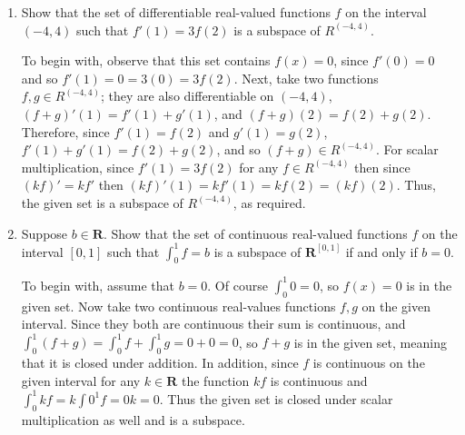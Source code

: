 \documentclass{book}
\begin{document}
\begin{enumerate}
(d) Since the derivative of two functions is additive, if \(f'(2) = b\) and \(g'(2) = b\) and \(b \neq 0\) then \((f+g)'(2) = f'(2) + g'(2) = b + b \neq b\); so, the given subset is not closed under addition (nor scalar multiplication) and cannot be a subspace.  However, any linear combination of functions with \(f'(2)=0\) will also have zero derivative at \(2\) and the zero function \(f(x) = 0\) is contained in the subspace for \(b=0\), so the given set with \(b=0\) is a subspace of \(\textbf{R}^{(0,3)}\).

(e) The limit of a sequence is additive and multiplicative in the sense that if \(\).  Since \(0 + 0 = 0\) and \(\alpha 0 = 0\) for any \(\alpha \in \textbf{C}\), the given subset is closed under addition and scalar multiplication and - since the sequence \((0)\) obviously has limit zero - also contains the additive identity of \(\textbf{C}^{\infty}\). Therefore, the given subset is a subspace of \(\textbf{C}^{\infty}\).

\item Show that the set of differentiable real-valued functions \(f\) on the interval \((-4,4)\) such that \(f'(1)=3f(2)\) is a subspace of \(R^{(-4,4)}\).

To begin with, observe that this set contains \(f(x)=0\), since \(f'(0)=0\) and so \(f'(1)=0=3(0)=3f(2)\).  Next, take two functions \(f,g \in R^{(-4,4)}\); they are also differentiable on \((-4,4)\), \((f+g)'(1)=f'(1)+g'(1)\), and \((f+g)(2)=f(2)+g(2)\).  Therefore, since \(f'(1)=f(2)\) and \(g'(1)=g(2)\), \(f'(1)+g'(1)=f(2)+g(2)\), and so  \((f+g) \in R^{(-4,4)}\).  For scalar multiplication, since \(f'(1)=3f(2)\) for any \(f \in R^{(-4,4)}\) then since \((kf)'=kf'\) then \((kf)'(1)=kf'(1)=kf(2)=(kf)(2)\).  Thus, the given set is a subspace of \(R^{(-4,4)}\), as required.

\item Suppose \(b \in \textbf{R}\).  Show that the set of continuous real-valued functions \(f\) on the interval \([0,1]\) such that \(\int_{0}^{1} f=b\) is a subspace of \(\textbf{R}^{[0,1]}\) if and only if \(b=0\).

To begin with, assume that \(b=0\).  Of course \(\int_{0}^{1} 0 = 0\), so \(f(x)=0\) is in the given set.  Now take two continuous real-values functions \(f,g\) on the given interval.  Since they both are continuous their sum is continuous, and \(\int_{0}^{1} (f+g)=\int_{0}^{1} f+\int_{0}^{1} g=0+0=0\), so \(f+g\) is in the given set, meaning that it is closed under addition.  In addition, since \(f\) is continuous on the given interval for any \(k \in \textbf{R}\) the function \(kf\) is continuous and \(\int_{0}^{1} kf=k\int{0}^{1} f = 0k=0\).  Thus the given set is closed under scalar multiplication as well and is a subspace.


\end{enumerate}
\end{document}
